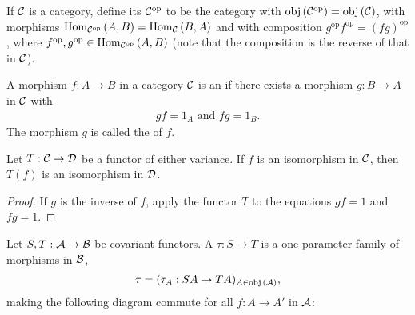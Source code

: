    \begin{definition}\label{def:opposite-categories}
        If $\mathcal{C}$ is a category, define its  $\mathcal{C}^\text{op}$ to be the category with $\operatorname{obj}{(\mathcal{C}^\text{op})} = \operatorname{obj}{(\mathcal{C})}$, with morphisms $\operatorname{Hom}_{\mathcal{C}^\text{op}}{(A,B)} = \operatorname{Hom}_{\mathcal{C}}{(B,A)}$ and with composition $g^\text{op}f^\text{op} = (fg)^\text{op}$, where $f^\text{op} , g^\text{op} \in \operatorname{Hom}_{\mathcal{C}^\text{op}}{(A,B)}$ (note that the composition is the reverse of that in $\mathcal{C}$).
    \end{definition}

    \begin{definition}\label{def:isomorphsism}
        A morphism $f:A \rightarrow B$ in a category $\mathcal{C}$ is an  if there exists a morphism $g: B \rightarrow A$ in $\mathcal{C}$ with
            \begin{equation*}
            \begin{split}
                gf = 1_A \hspace{4pt} \text{and} \hspace{4pt} fg = 1_B.
            \end{split}
            \end{equation*}
        The morphism $g$ is called the  of $f$.
    \end{definition}

    \begin{proposition}
        Let $T:\mathcal{C} \rightarrow \mathcal{D}$ be a functor of either variance. If $f$ is an isomorphism in $\mathcal{C}$, then $T(f)$ is an isomorphism in $\mathcal{D}$.
    \end{proposition}
        \begin{proof}
            If $g$ is the inverse of $f$, apply the functor $T$ to the equations $gf = 1$ and $fg = 1$.
        \end{proof}
    
    \begin{definition}\label{def:natural-transformation}
        Let $S,T: \mathcal{A} \rightarrow \mathcal{B}$ be covariant functors. A  $\tau: S \rightarrow T$ is a one-parameter family of morphisms in $\mathcal{B}$,
            \begin{equation*}
            \begin{split}
                \tau = (\tau_A : SA \rightarrow TA)_{A \in \operatorname{obj}{(\mathcal{A})}},
            \end{split}
            \end{equation*}
        making the following diagram commute for all $f: A \rightarrow A'$ in $\mathcal{A}$:
            \begin{center}
            \end{center}
    \end{definition}

